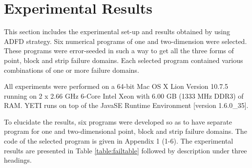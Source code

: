 \section{Experimental Results} \label{sec:experimentalResults}
This section includes the experimental set-up and results obtained by using ADFD strategy. Six numerical programs of one and two-dimension were selected. These programs were error-seeded in such a way to get all the three forms of point, block and strip failure domains. Each selected program contained various combinations of one or more failure domains. 

All experiments were performed on a 64-bit Mac OS X Lion Version 10.7.5 running on 2 x 2.66 GHz 6-Core Intel Xeon with 6.00 GB (1333 MHz DDR3) of RAM. YETI runs on top of the Java\texttrademark  SE Runtime Environment [version 1.6.0\_35]. 

To elucidate the results, six programs were developed so as to have separate program for one and two-dimensional point, block and strip failure domains. The code of the selected program is given in Appendix 1 (1-6). The experimental results are presented in Table \ref{table:failtable} followed by description under three headings.

